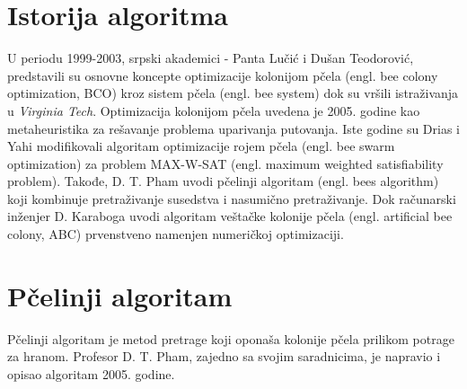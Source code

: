 \documentclass[a4paper]{article}
\begin{document}
{\section{Istorija algoritma}
U periodu 1999-2003, srpski akademici - Panta Lučić i Dušan Teodorović, predstavili su osnovne koncepte optimizacije kolonijom pčela (engl. bee colony optimization, BCO) kroz sistem pčela (engl. bee system) dok su vršili istraživanja u {\em Virginia Tech}\cite{algoritam}. Optimizacija kolonijom pčela uvedena je 2005. godine kao metaheuristika za rešavanje problema uparivanja putovanja. Iste godine su Drias i
Yahi modifikovali algoritam optimizacije rojem pčela (engl. bee swarm optimization) za
problem MAX-W-SAT (engl. maximum weighted satisfiability problem). Takođe, D. T. Pham uvodi pčelinji algoritam (engl. bees algorithm) koji kombinuje
pretraživanje susedstva i nasumično pretraživanje.\cite{istorijat} Dok računarski inženjer D. Karaboga uvodi algoritam veštačke kolonije pčela (engl. artificial bee colony, ABC) prvenstveno
namenjen numeričkoj optimizaciji.


\section{Pčelinji algoritam}
Pčelinji algoritam je metod pretrage koji oponaša kolonije pčela prilikom potrage za hranom\cite{sajt_algoritma}. Profesor D. T. Pham, zajedno sa svojim saradnicima, je napravio i opisao algoritam 2005. godine.

}
\end{document}
